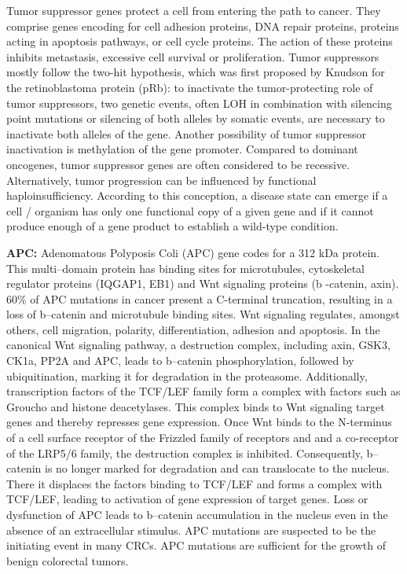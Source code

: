       Tumor suppressor genes protect a cell from entering the path to cancer.
      They comprise genes encoding for cell adhesion proteins,  DNA repair
      proteins, proteins acting in apoptosis pathways, or cell cycle proteins.
      The action of these proteins inhibits metastasis, excessive cell survival
      or proliferation. Tumor suppressors mostly follow the two-hit hypothesis,
      which was first proposed by Knudson  for the retinoblastoma protein (pRb):
      to inactivate the tumor-protecting role of tumor suppressors, two genetic
      events, often LOH in  combination with silencing point mutations or
      silencing of both alleles by somatic events, are necessary to inactivate
      both alleles of the gene. Another possibility of tumor suppressor
      inactivation is methylation of the gene promoter. Compared to dominant
      oncogenes, tumor suppressor genes are often considered to be recessive.
      Alternatively, tumor progression can be influenced by functional
      haploinsufficiency. According to this conception, a disease state can
      emerge if a cell / organism has only one functional copy of a given gene
      and if it cannot  produce enough of a gene product to establish a
      wild-type condition.

      \textbf{APC:} Adenomatous Polyposis Coli (APC) gene codes for a 312 kDa
      protein. This multi--domain protein has binding sites for microtubules,
      cytoskeletal regulator proteins (IQGAP1, EB1) and Wnt signaling proteins
      (b -catenin, axin). 60\% of APC mutations in cancer present a
      C-terminal truncation, resulting in a loss of b--catenin and
      microtubule binding sites. Wnt signaling regulates, amongst others, cell
      migration, polarity, differentiation, adhesion and apoptosis. In the
      canonical Wnt signaling pathway, a destruction complex, including axin,
      GSK3, CK1a, PP2A and APC, leads to b--catenin phosphorylation,
      followed by ubiquitination, marking it for degradation in the proteasome.
      Additionally, transcription factors of the TCF/LEF family form a complex
      with factors such as Groucho and histone deacetylases. This complex binds
      to Wnt signaling target genes and thereby represses gene expression. Once
      Wnt binds to the N-terminus of a cell surface receptor of the Frizzled
      family of receptors and and a co-receptor of the LRP5/6 family, the
      destruction complex is inhibited. Consequently, b--catenin is no
      longer marked for degradation and can translocate to the nucleus. There it
      displaces the factors binding to TCF/LEF and forms a complex with TCF/LEF,
      leading to activation of gene expression of target genes. Loss or
      dysfunction of APC leads to b--catenin accumulation in the nucleus
      even in the absence of  an extracellular stimulus. APC mutations are suspected to be the initiating event in many CRCs. APC
      mutations are sufficient for the growth of benign colorectal tumors.

